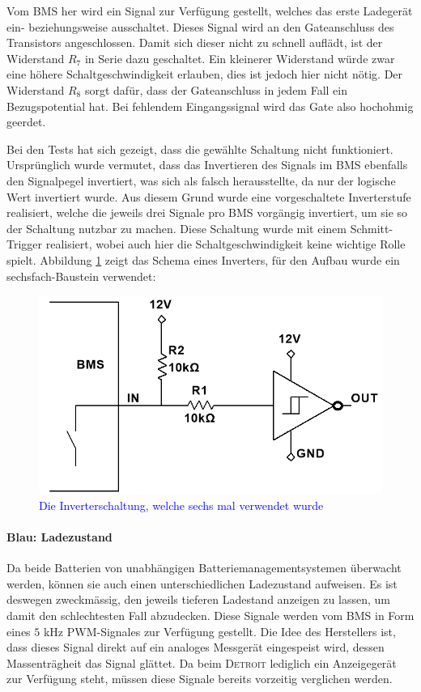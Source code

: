 Vom BMS her wird ein Signal zur Verfügung gestellt, welches das erste Ladegerät ein- beziehungsweise ausschaltet. Dieses Signal wird an den Gateanschluss des Transistors angeschlossen. Damit sich dieser nicht zu schnell auflädt, ist der Widerstand $R_7$ in Serie dazu geschaltet. Ein kleinerer Widerstand würde zwar eine höhere Schaltgeschwindigkeit erlauben, dies ist jedoch hier nicht nötig. Der Widerstand $R_8$ sorgt dafür, dass der Gateanschluss in jedem Fall ein Bezugspotential hat. Bei fehlendem Eingangssignal wird das Gate also hochohmig geerdet.

\color{blue}
Bei den Tests hat sich gezeigt, dass die gewählte Schaltung nicht funktioniert. Ursprünglich wurde vermutet, dass das Invertieren des Signals im BMS ebenfalls den Signalpegel invertiert, was sich als falsch herausstellte, da nur der logische Wert invertiert wurde. Aus diesem Grund wurde eine vorgeschaltete Inverterstufe realisiert, welche die jeweils drei Signale pro BMS vorgängig invertiert, um sie so der Schaltung nutzbar zu machen. Diese Schaltung wurde mit einem Schmitt-Trigger realisiert, wobei auch hier die Schaltgeschwindigkeit keine wichtige Rolle spielt. Abbildung \ref{fig:Inverter} zeigt das Schema eines Inverters, für den Aufbau wurde ein sechsfach-Baustein verwendet:

\begin{figure}[h]
	\centering
		\includegraphics[width=.60\textwidth]{images/Inverter.png}
	\caption{\textcolor{blue}{Die Inverterschaltung, welche sechs mal verwendet wurde}}
	\label{fig:Inverter}
\end{figure}
\color{black}

\newpage

\paragraph{Blau: Ladezustand}
Da beide Batterien von unabhängigen Batteriemanagementsystemen überwacht werden, können sie auch einen unterschiedlichen Ladezustand aufweisen. Es ist deswegen zweckmässig, den jeweils tieferen Ladestand anzeigen zu lassen, um damit den schlechtesten Fall abzudecken. Diese Signale werden vom BMS in Form eines $5$ kHz PWM-Signales zur Verfügung gestellt. Die Idee des Herstellers ist, dass dieses Signal direkt auf ein analoges Messgerät eingespeist wird, dessen Massenträgheit das Signal glättet. Da beim \textsc{Detroit} lediglich ein Anzeigegerät zur Verfügung steht, müssen diese Signale bereits vorzeitig verglichen werden.

